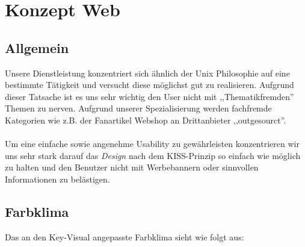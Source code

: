 \chapter{Konzept Web}

\section{Allgemein}

Unsere Dienstleistung konzentriert sich ähnlich der Unix Philosophie auf eine
bestimmte Tätigkeit und versucht diese möglichst gut zu realisieren. Aufgrund
dieser Tatsache ist es uns sehr wichtig den User nicht mit ,,Thematikfremden''
Themen zu nerven. Aufgrund unserer Spezialisierung werden fachfremde Kategorien
wie z.B. der Fanartikel Webshop an Drittanbieter ,,outgesourct''.
\\
\\
Um eine einfache sowie angenehme Usability zu gewährleisten konzentrieren wir
uns sehr stark darauf das \emph{Design} nach dem KISS-Prinzip so einfach wie
möglich zu halten und den Benutzer nicht mit Werbebannern oder sinnvollen
Informationen zu belästigen.

\newpage

\section{Farbklima}
Das an den Key-Visual angepasste Farbklima sieht wie folgt aus:

